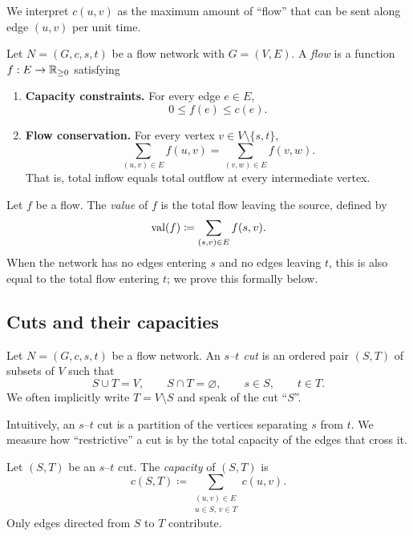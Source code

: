 \documentclass[11pt]{article}
\begin{document}
We interpret $c(u,v)$ as the maximum amount of ``flow'' that can be sent along
edge $(u,v)$ per unit time.

\begin{definition}[Flow]
Let $N=(G,c,s,t)$ be a flow network with $G=(V,E)$.
A \emph{flow} is a function $f : E \to \mathbb{R}_{\ge 0}$ satisfying
\begin{enumerate}[label=(\roman*), itemsep=0.2em]
  \item \textbf{Capacity constraints.} For every edge $e\in E$,
  \[
    0 \le f(e) \le c(e).
  \]
  \item \textbf{Flow conservation.} For every vertex $v \in V \setminus \{s,t\}$,
  \[
    \sum_{(u,v)\in E} f(u,v) = \sum_{(v,w)\in E} f(v,w).
  \]
  That is, total inflow equals total outflow at every intermediate vertex.
\end{enumerate}
\end{definition}

\begin{definition}
Let $f$ be a flow. The \emph{value} of $f$ is the total flow leaving the source,
defined by
\[
  \mathrm{val}(f) \coloneqq \sum_{(s,v)\in E} f(s,v).
\]
When the network has no edges entering $s$ and no edges leaving $t$, this is
also equal to the total flow entering $t$; we prove this formally below.
\end{definition}

\subsection{Cuts and their capacities}

\begin{definition}[$s$--$t$ cut]
Let $N=(G,c,s,t)$ be a flow network. An \emph{$s$--$t$ cut} is an ordered pair
$(S,T)$ of subsets of $V$ such that
\[
  S \cup T = V, \qquad S \cap T = \varnothing, \qquad s \in S, \qquad t \in T.
\]
We often implicitly write $T = V \setminus S$ and speak of the cut ``$S$''.
\end{definition}

Intuitively, an $s$--$t$ cut is a partition of the vertices separating $s$ from
$t$. We measure how ``restrictive'' a cut is by the total capacity of the edges
that cross it.

\begin{definition}
Let $(S,T)$ be an $s$--$t$ cut. The \emph{capacity} of $(S,T)$ is
\[
  c(S,T) \coloneqq \sum_{\substack{(u,v)\in E\\ u\in S,\, v\in T}} c(u,v).
\]
Only edges directed from $S$ to $T$ contribute.
\end{definition}
\end{document}
